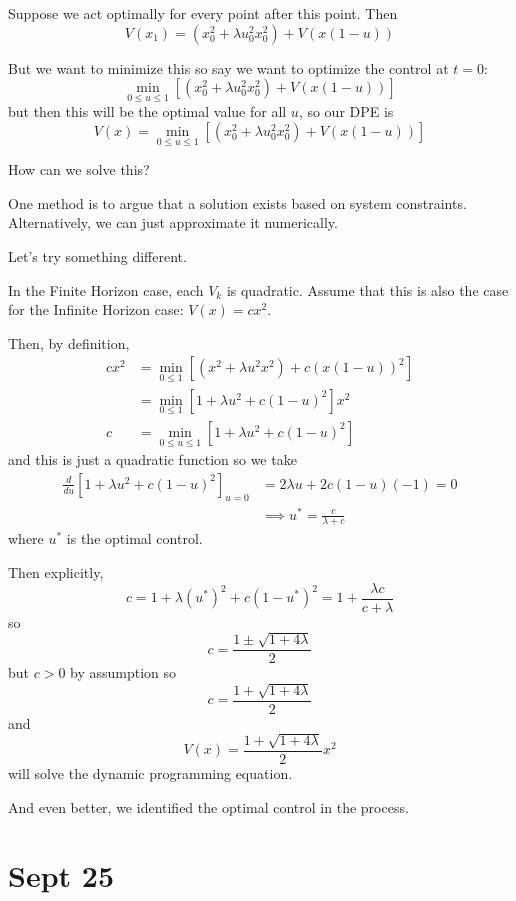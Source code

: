 \documentclass[12pt]{report}
\begin{document}
        Suppose we act optimally for every point after this point. Then 
        \[V(x_1) = (x_0^2 + \lambda u_0^2 x_0^2) + V(x(1- u))\]

        But we want to minimize this so say we want to optimize the control at $t = 0$: 
        \[\min_{0\leq u \leq 1} \left[(x_0^2 + \lambda u_0^2 x_0^2) + V(x(1- u))\right]\]
        but then this will be the optimal value for all $u$, so our DPE is 
        \[V(x) = \min_{0\leq u \leq 1} \left[(x_0^2 + \lambda u_0^2 x_0^2) + V(x(1- u))\right] \]

        How can we solve this? 

        One method is to argue that a solution exists based on system constraints. Alternatively, we can just approximate it numerically. 

        Let's try something different. 

        In the Finite Horizon case, each $V_k$ is quadratic. Assume that this is also the case for the Infinite Horizon case: $V(x) = cx^2$. 

        Then, by definition,
        \begin{align*}
            cx^2 &= \min_{0 \leq 1} \left[(x^2 + \lambda u^2 x^2) + c(x(1- u))^2\right]\\ 
            &= \min_{0 \leq 1} \left[1 + \lambda u^2 + c(1 - u)^2\right]x^2\\
            c &= \min_{0 \leq u \leq 1} \left[1 + \lambda u^2 + c(1 - u)^2\right]
        \end{align*}
        and this is just a quadratic function so we take 
        \begin{align*}
            \frac{d}{du} \left[1 + \lambda u^2 + c(1 - u)^2\right]_{u =0} &= 2\lambda u + 2c(1 - u)(-1) = 0\\ 
            &\implies u^* = \frac{c}{\lambda + c}
        \end{align*}
        where $u^*$ is the optimal control.

        Then explicitly, 
        \[c = 1 + \lambda(u^*)^2 + c(1 - u^*)^2 = 1 + \frac{\lambda c}{c + \lambda}\]
        so 
        \[c = \frac{1 \pm \sqrt{1 + 4\lambda}}{2}\]
        but $c > 0$ by assumption so 
        \[c = \frac{1 + \sqrt{1 + 4\lambda}}{2}\]   
        and 
        \[V(x) = \frac{1 + \sqrt{1 + 4\lambda}}{2}x^2\]
        will solve the dynamic programming equation. 

        And even better, we identified the optimal control in the process. 

\section{Sept 25}
\end{document}
